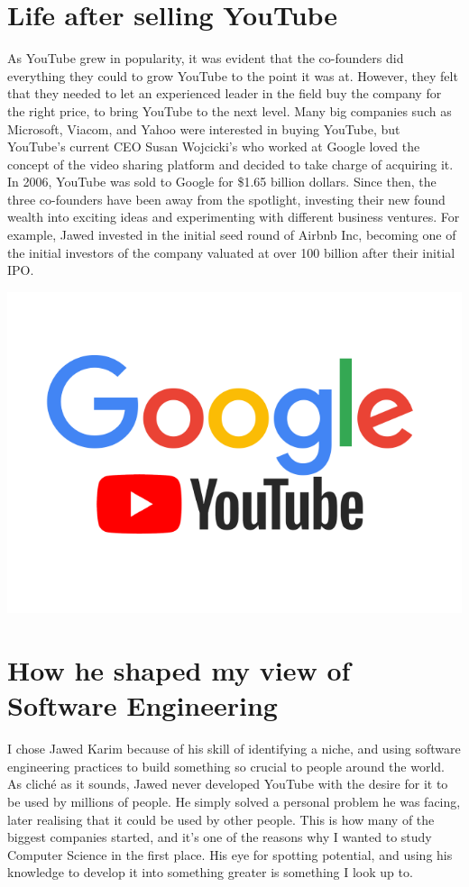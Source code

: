 \documentclass[12pt,a4paper]{article}
\begin{document}
\section{Life after selling YouTube}\label{sec:res2}
As YouTube grew in popularity, it was evident that the co-founders did everything they could to grow YouTube to the point it was at. However, they felt that they needed to let an experienced leader in the field buy the company for the right price, to bring YouTube to the next level. Many big companies such as Microsoft, Viacom, and Yahoo were interested in buying YouTube, but YouTube's current CEO Susan Wojcicki's who worked at Google loved the concept of the video sharing platform and decided to take charge of acquiring it. In 2006, YouTube was sold to Google for \$1.65 billion dollars. Since then, the three co-founders have been away from the spotlight, investing their new found wealth into exciting ideas and experimenting with different business ventures. For example, Jawed invested in the initial seed round of Airbnb Inc, becoming one of the initial investors of the company valuated at over 100 billion after their initial IPO.
\begin{center}
\includegraphics[scale=0.2]{images/GoogleYoutubeLogo.png}
\end{center}
\section{How he shaped my view of Software Engineering}\label{sec:res3}
I chose Jawed Karim because of his skill of identifying a niche, and using software engineering practices to build something so crucial to people around the world. As cliché as it sounds, Jawed never developed YouTube with the desire for it to be used by millions of people. He simply solved a personal problem he was facing, later realising that it could be used by other people. This is how many of the biggest companies started, and it's one of the reasons why I wanted to study Computer Science in the first place. His eye for spotting potential, and using his knowledge to develop it into something greater is something I look up to.
\end{document}
